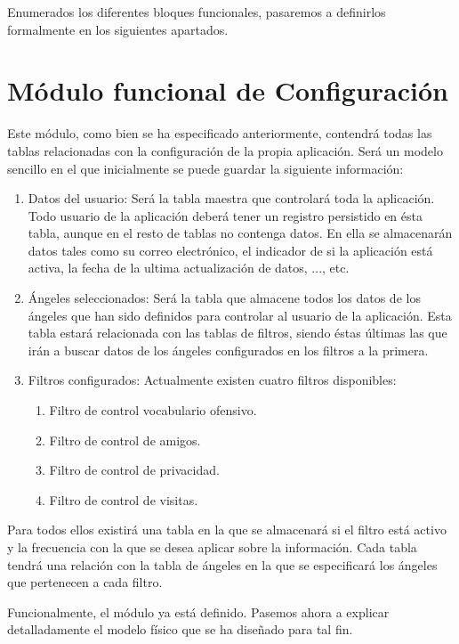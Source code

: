 \bigskip
\par
Enumerados los diferentes bloques funcionales, pasaremos a definirlos formalmente en los siguientes apartados.

\section{Módulo funcional de Configuración}
Este módulo, como bien se ha especificado anteriormente, contendrá todas las tablas relacionadas con la configuración de la propia aplicación. Será un modelo sencillo en el que inicialmente se puede guardar la siguiente información:
\begin{enumerate}
\item Datos del usuario: Será la tabla maestra que controlará toda la aplicación. Todo usuario de la aplicación deberá tener un registro persistido en ésta tabla, aunque en el resto de tablas no contenga datos. En ella se almacenarán datos tales como su correo electrónico, el indicador de si la aplicación está activa, la fecha de la ultima actualización de datos, ..., etc.
\item Ángeles seleccionados: Será la tabla que almacene todos los datos de los ángeles que han sido definidos para controlar al usuario de la aplicación. Esta tabla estará relacionada con las tablas de filtros, siendo éstas últimas las que irán a buscar datos de los ángeles configurados en los filtros a la primera.
\item Filtros configurados: Actualmente existen cuatro filtros disponibles:
\begin{enumerate}
\item Filtro de control vocabulario ofensivo.
\item Filtro de control de amigos.
\item Filtro de control de privacidad.
\item Filtro de control de visitas.
\end{enumerate}
\end{enumerate}
Para todos ellos existirá una tabla en la que se almacenará si el filtro está activo y la frecuencia con la que se desea aplicar sobre la información. Cada tabla tendrá una relación con la tabla de ángeles en la que se especificará los ángeles que pertenecen a cada filtro.
\bigskip
\par 
Funcionalmente, el módulo ya está definido. Pasemos ahora a explicar detalladamente el modelo físico que se ha diseñado para tal fin.
